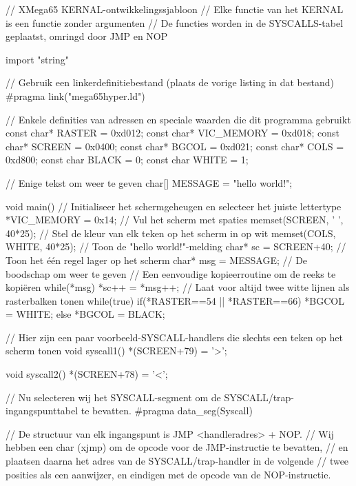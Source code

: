\begin{screencode}
// XMega65 KERNAL-ontwikkelingssjabloon
// Elke functie van het KERNAL is een functie zonder argumenten
// De functies worden in de SYSCALLS-tabel geplaatst, omringd door JMP en NOP

import "string"

// Gebruik een linkerdefinitiebestand (plaats de vorige listing in dat bestand)
#pragma link("mega65hyper.ld")

// Enkele definities van adressen en speciale waarden die dit programma gebruikt
const char* RASTER = 0xd012;
const char* VIC_MEMORY = 0xd018;
const char* SCREEN = 0x0400;
const char* BGCOL = 0xd021;
const char* COLS = 0xd800;
const char BLACK = 0;
const char WHITE = 1;

// Enige tekst om weer te geven
char[] MESSAGE = "hello world!";
\end{screencode}

\begin{screencode}
void main() {
    // Initialiseer het schermgeheugen en selecteer het juiste lettertype
    *VIC_MEMORY = 0x14;
    // Vul het scherm met spaties
    memset(SCREEN, ' ', 40*25);
    // Stel de kleur van elk teken op het scherm in op wit
    memset(COLS, WHITE, 40*25);
    // Toon de "hello world!"-melding
    char* sc = SCREEN+40;  // Toon het één regel lager op het scherm
    char* msg = MESSAGE; // De boodschap om weer te geven
    // Een eenvoudige kopieerroutine om de reeks te kopiëren
    while(*msg) {
        *sc++ = *msg++;
    }
    // Laat voor altijd twee witte lijnen als rasterbalken tonen
    while(true) {
        if(*RASTER==54 || *RASTER==66) {
            *BGCOL = WHITE;
        } else {
            *BGCOL = BLACK;
        }
    }
}

// Hier zijn een paar voorbeeld-SYSCALL-handlers die slechts een teken op het scherm tonen
void syscall1() {
    *(SCREEN+79) = '>';
}

void syscall2() {
    *(SCREEN+78) = '<';
}

// Nu selecteren wij het SYSCALL-segment om de SYSCALL/trap-ingangspunttabel te bevatten.
#pragma data_seg(Syscall)

// De structuur van elk ingangspunt is JMP <handleradres> + NOP.
// Wij hebben een char (xjmp) om de opcode voor de JMP-instructie te bevatten,
// en plaatsen daarna het adres van de SYSCALL/trap-handler in de volgende
// twee posities als een aanwijzer, en eindigen met de opcode van de NOP-instructie.
\end{screencode}

